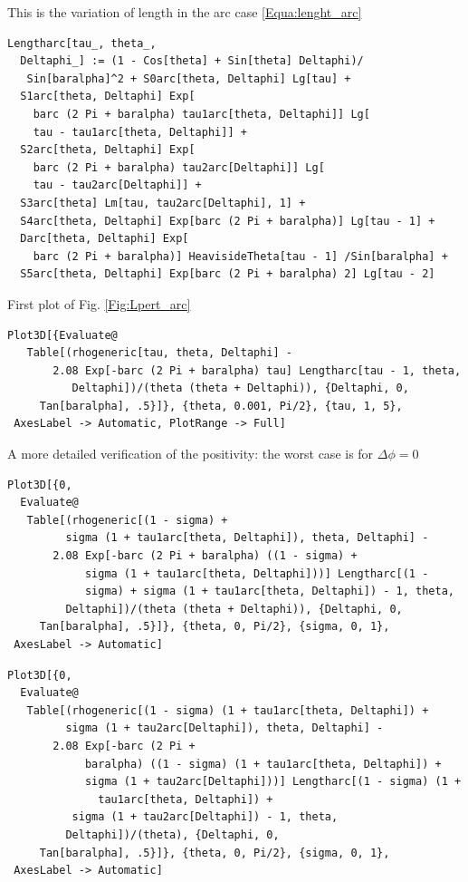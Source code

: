 \documentclass[reqno]{amsart}
\theoremstyle{definition} \newtheorem{definition}{Definition}[section]
\theoremstyle{definition} \newtheorem{remark}[definition]{Remark}
\theoremstyle{plain} \newtheorem{lemma}[definition]{Lemma}
\theoremstyle{plain} \newtheorem{proposition}[definition]{Proposition}
\theoremstyle{plain} \newtheorem{theorem}[definition]{Theorem}
\theoremstyle{plain} \newtheorem{corollary}[definition]{Corollary}
\theoremstyle{definition} \newtheorem{example}[definition]{Example}
\theoremstyle{plain} \newtheorem{claim}[clai]{Claim}
\theoremstyle{definition} \newtheorem{assumption}[definition]{Assumption}
\theoremstyle{definition} \newtheorem{observation}[definition]{Observation}
\newcommand{\1}{\mathbbm 1}
\newcommand{\smed}{\medskip}
\newcommand{\sbig}{\bigskip}
\numberwithin{equation}{section} %
\theoremstyle{plain} \newtheorem*{theorem*}{Theorem}
\theoremstyle{plain} \newtheorem{mthm}[maintheorem]{Main Theorem}
\theoremstyle{plain} \newtheorem*{mthm*}{Main Theorem}
\theoremstyle{plain} \newtheorem*{conjecture*}{Conjecture}
\theoremstyle{plain} \newtheorem{conjecture}[definition]{Conjecture}
\theoremstyle{plain} \newtheorem*{problem*}{Problem}
\begin{document}
\sbig


\sbig

\noindent This is the variation of length in the arc case \eqref{Equa:lenght_arc}
\smed
\begin{verbatim}
Lengtharc[tau_, theta_, 
  Deltaphi_] := (1 - Cos[theta] + Sin[theta] Deltaphi)/
   Sin[baralpha]^2 + S0arc[theta, Deltaphi] Lg[tau] + 
  S1arc[theta, Deltaphi] Exp[
    barc (2 Pi + baralpha) tau1arc[theta, Deltaphi]] Lg[
    tau - tau1arc[theta, Deltaphi]] + 
  S2arc[theta, Deltaphi] Exp[
    barc (2 Pi + baralpha) tau2arc[Deltaphi]] Lg[
    tau - tau2arc[Deltaphi]] + 
  S3arc[theta] Lm[tau, tau2arc[Deltaphi], 1] + 
  S4arc[theta, Deltaphi] Exp[barc (2 Pi + baralpha)] Lg[tau - 1] + 
  Darc[theta, Deltaphi] Exp[
    barc (2 Pi + baralpha)] HeavisideTheta[tau - 1] /Sin[baralpha] + 
  S5arc[theta, Deltaphi] Exp[barc (2 Pi + baralpha) 2] Lg[tau - 2]
\end{verbatim}
\smed
First plot of Fig. \ref{Fig:Lpert_arc}
\smed
\begin{verbatim}
Plot3D[{Evaluate@
   Table[(rhogeneric[tau, theta, Deltaphi] - 
       2.08 Exp[-barc (2 Pi + baralpha) tau] Lengtharc[tau - 1, theta,
          Deltaphi])/(theta (theta + Deltaphi)), {Deltaphi, 0, 
     Tan[baralpha], .5}]}, {theta, 0.001, Pi/2}, {tau, 1, 5}, 
 AxesLabel -> Automatic, PlotRange -> Full]
\end{verbatim}
\smed
A more detailed verification of the positivity: the worst case is for $\Delta \phi = 0$
\smed
\begin{verbatim}
Plot3D[{0, 
  Evaluate@
   Table[(rhogeneric[(1 - sigma) + 
         sigma (1 + tau1arc[theta, Deltaphi]), theta, Deltaphi] - 
       2.08 Exp[-barc (2 Pi + baralpha) ((1 - sigma) + 
            sigma (1 + tau1arc[theta, Deltaphi]))] Lengtharc[(1 - 
            sigma) + sigma (1 + tau1arc[theta, Deltaphi]) - 1, theta, 
         Deltaphi])/(theta (theta + Deltaphi)), {Deltaphi, 0, 
     Tan[baralpha], .5}]}, {theta, 0, Pi/2}, {sigma, 0, 1}, 
 AxesLabel -> Automatic]
\end{verbatim}
\begin{verbatim}
Plot3D[{0, 
  Evaluate@
   Table[(rhogeneric[(1 - sigma) (1 + tau1arc[theta, Deltaphi]) + 
         sigma (1 + tau2arc[Deltaphi]), theta, Deltaphi] - 
       2.08 Exp[-barc (2 Pi + 
            baralpha) ((1 - sigma) (1 + tau1arc[theta, Deltaphi]) + 
            sigma (1 + tau2arc[Deltaphi]))] Lengtharc[(1 - sigma) (1 +
              tau1arc[theta, Deltaphi]) + 
          sigma (1 + tau2arc[Deltaphi]) - 1, theta, 
         Deltaphi])/(theta), {Deltaphi, 0, 
     Tan[baralpha], .5}]}, {theta, 0, Pi/2}, {sigma, 0, 1}, 
 AxesLabel -> Automatic]
\end{verbatim}
\end{document}
